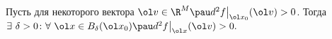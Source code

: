\label{dva}
	 Пусть для некоторого вектора $\ol v \in \R^M\pau d^2f\big|_{\ol x_0}(\ol v)>0$. Тогда 
	 \(\exists\ \delta >0\colon \forall\ \ol x\in B_\delta (\ol x_0)\pau d^2f\big|_{\ol x}(\ol v)>0\ldotp\)
	 